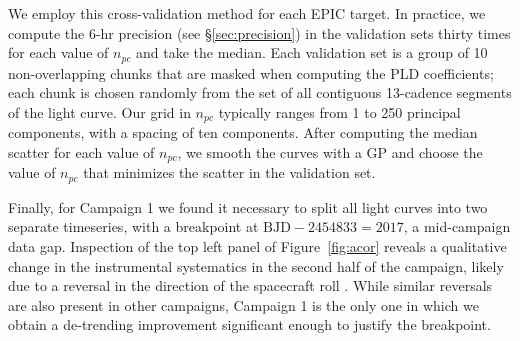 \documentclass[]{emulateapj}
\begin{document}
We employ this cross-validation method for each EPIC target. In practice, we compute the 6-hr precision
(see \S\ref{sec:precision}) in the validation sets thirty times for each value of $n_{pc}$ and take the median. 
Each validation set is a group of 10 non-overlapping chunks that are masked when computing the PLD coefficients; each
chunk is chosen randomly from the set of all contiguous 13-cadence segments of the light curve. 
Our grid in $n_{pc}$ typically ranges from 1 to 250 principal components, with a spacing of ten components.
After computing the median scatter for each value of $n_{pc}$, we smooth the curves with a GP and choose the 
value of $n_{pc}$ that minimizes the scatter in the validation set.

Finally, for Campaign 1 we found it necessary to split all light curves into two separate
timeseries, with a breakpoint at $\mathrm{BJD} - 2454833 = 2017$, a mid-campaign data gap. 
Inspection of the top
left panel of Figure~\ref{fig:acor} reveals a qualitative change in the instrumental
systematics in the second half of the campaign, likely due to a reversal in the direction
of the spacecraft roll \citep[see, e.g.,][]{AIG16}. While similar reversals are also present 
in other campaigns, Campaign 1 is the only one in which we obtain a de-trending improvement 
significant enough to justify the breakpoint. 

\end{document}
